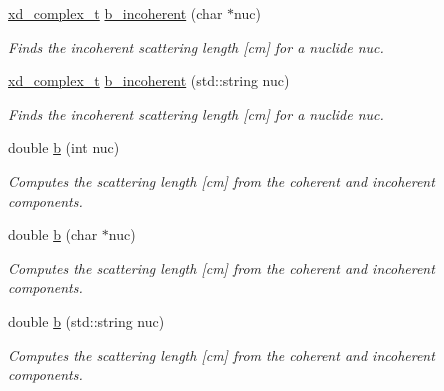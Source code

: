 \begin{DoxyCompactItemize}
\mbox{\label{namespacepyne_a9088e0fc374d045d9e643b943b35d091}} 
\hyperlink{structxd__complex__t}{xd\+\_\+complex\+\_\+t} \hyperlink{namespacepyne_a9088e0fc374d045d9e643b943b35d091}{b\+\_\+incoherent} (char $\ast$nuc)
\begin{DoxyCompactList}\small\item\em Finds the incoherent scattering length \mbox{[}cm\mbox{]} for a nuclide {\itshape nuc}. \end{DoxyCompactList}\item 
\mbox{\label{namespacepyne_ac1e839bc561307fd34ed6905a0ca7209}} 
\hyperlink{structxd__complex__t}{xd\+\_\+complex\+\_\+t} \hyperlink{namespacepyne_ac1e839bc561307fd34ed6905a0ca7209}{b\+\_\+incoherent} (std\+::string nuc)
\begin{DoxyCompactList}\small\item\em Finds the incoherent scattering length \mbox{[}cm\mbox{]} for a nuclide {\itshape nuc}. \end{DoxyCompactList}\item 
\mbox{\label{namespacepyne_a12664d38214170260d6a69c4f5dda8da}} 
double \hyperlink{namespacepyne_a12664d38214170260d6a69c4f5dda8da}{b} (int nuc)
\begin{DoxyCompactList}\small\item\em Computes the scattering length \mbox{[}cm\mbox{]} from the coherent and incoherent components. \end{DoxyCompactList}\item 
\mbox{\label{namespacepyne_a702614f522de6463e3cf4f2b188a75ef}} 
double \hyperlink{namespacepyne_a702614f522de6463e3cf4f2b188a75ef}{b} (char $\ast$nuc)
\begin{DoxyCompactList}\small\item\em Computes the scattering length \mbox{[}cm\mbox{]} from the coherent and incoherent components. \end{DoxyCompactList}\item 
\mbox{\label{namespacepyne_a6b580c22fa1b5b26da1185723491fc3a}} 
double \hyperlink{namespacepyne_a6b580c22fa1b5b26da1185723491fc3a}{b} (std\+::string nuc)
\begin{DoxyCompactList}\small\item\em Computes the scattering length \mbox{[}cm\mbox{]} from the coherent and incoherent components. \end{DoxyCompactList}\end{DoxyCompactItemize}
